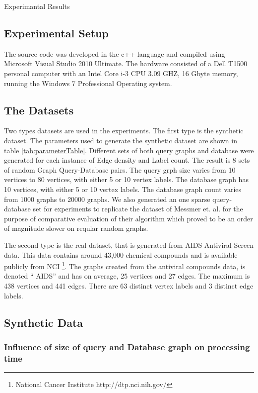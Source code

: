 Experimantal Results

\subsection{Experimental Setup}
The source code was developed in the c++ language and compiled using Microsoft Visual Studio 2010 Ultimate. The hardware consisted of a Dell T1500 personal computer with an
Intel Core i-3 CPU 3.09 GHZ, 16 Gbyte memory, running the Windows 7 Professional Operating system.

\subsection{The Datasets}

Two types datasets are used in the experiments. The first type is the synthetic dataset. The parameters used to generate the synthetic dataset are shown in table \ref{tab:parameterTable}. Different sets of both query graphs and database were generated for each instance of Edge density and Label count. The result is 8 sets of random Graph Query-Database pairs. The query grph size varies from 10 vertices to 80 vertices, with either 5 or 10 vertex labels. The database graph has 10 vertices, with either 5 or 10 vertex labels. The database graph count varies from 1000 graphs to 20000 graphs. We also generated an one sparse query-database set for experiments to replicate the dataset of Messmer et. al. for the purpose of comparative evaluation of their algorithm which proved to be an order of magnitude slower on reqular random graphs.

The second type is the real dataset, that is generated from AIDS Antiviral Screen data. This data contains around 43,000 chemical compounds and is available publicly from NCI \footnote{National Cancer Institute http://dtp.nci.nih.gov/}. The graphs created from the antiviral compounds data, is denoted `` AIDS'' and has on average, 25 vertices and 27 edges. The maximum is 438 vertices and 441 edges. There are 63 distinct vertex labels and 3 distinct edge labels.

\subsection{Synthetic Data}



\subsubsection{Influence of size of query and Database graph on processing time}

